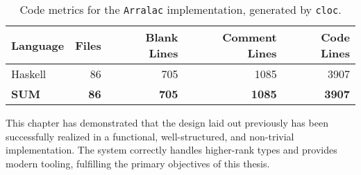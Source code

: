 \begin{table}[h!]
    \centering
    \label{table:cloc}
    \begin{tabular}{lrrrr}
        \toprule
        \textbf{Language} & \textbf{Files} & \textbf{Blank Lines} & \textbf{Comment Lines} & \textbf{Code Lines} \\
        \midrule
        Haskell           & 86             & 705                  & 1085                   & 3907                \\
        \midrule
        \textbf{SUM}      & \textbf{86}    & \textbf{705}         & \textbf{1085}          & \textbf{3907}       \\
        \bottomrule
    \end{tabular}
    \caption{Code metrics for the \texttt{Arralac} implementation, generated by \texttt{cloc}.}
\end{table}

This chapter has demonstrated that the design laid out previously has been successfully realized in a functional, well-structured, and non-trivial implementation. The system correctly handles higher-rank types and provides modern tooling, fulfilling the primary objectives of this thesis.
